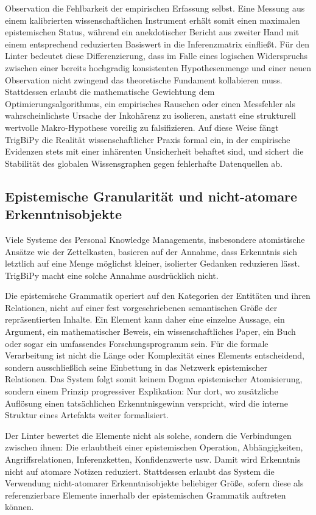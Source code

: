 \documentclass[11pt, a4paper]{article}
\begin{document}
Observation die Fehlbarkeit der empirischen Erfassung selbst. Eine Messung aus einem kalibrierten wissenschaftlichen Instrument erhält somit einen maximalen epistemischen Status, während ein anekdotischer Bericht aus zweiter Hand mit einem entsprechend reduzierten Basiswert in die Inferenzmatrix einfließt. Für den Linter bedeutet diese Differenzierung, dass im Falle eines logischen Widerspruchs zwischen einer bereits hochgradig konsistenten Hypothesenmenge und einer neuen Observation nicht zwingend das theoretische Fundament kollabieren muss. Stattdessen erlaubt die mathematische Gewichtung dem Optimierungsalgorithmus, ein empirisches Rauschen oder einen Messfehler als wahrscheinlichste Ursache der Inkohärenz zu isolieren, anstatt eine strukturell wertvolle Makro-Hypothese voreilig zu falsifizieren. Auf diese Weise fängt TrigBiPy die Realität wissenschaftlicher Praxis formal ein, in der empirische Evidenzen stets mit einer inhärenten Unsicherheit behaftet sind, und sichert die Stabilität des globalen Wissensgraphen gegen fehlerhafte Datenquellen ab.
	
	
	\subsection{Epistemische Granularität und nicht-atomare Erkenntnisobjekte}
	
	Viele Systeme des Personal Knowledge Managements, insbesondere atomistische Ansätze wie der Zettelkasten, basieren auf der Annahme, dass Erkenntnis sich letztlich auf eine Menge möglichst kleiner, isolierter Gedanken reduzieren lässt. TrigBiPy macht eine solche Annahme ausdrücklich nicht. 
	
	Die epistemische Grammatik operiert auf den Kategorien der Entitäten und ihren Relationen, nicht auf einer fest vorgeschriebenen semantischen Größe der repräsentierten Inhalte. Ein Element kann daher eine einzelne Aussage, ein Argument, ein mathematischer Beweis, ein wissenschaftliches Paper, ein Buch oder sogar ein umfassendes Forschungsprogramm sein. Für die formale Verarbeitung ist nicht die Länge oder Komplexität eines Elements entscheidend, sondern ausschließlich seine Einbettung in das Netzwerk epistemischer Relationen. Das System folgt somit keinem Dogma epistemischer Atomisierung, sondern einem Prinzip progressiver Explikation: Nur dort, wo zusätzliche Auflösung einen tatsächlichen Erkenntnisgewinn verspricht, wird die interne Struktur eines Artefakts weiter formalisiert.
	
	Der Linter bewertet die Elemente nicht als solche, sondern die Verbindungen zwischen ihnen: Die erlaubtheit einer epistemischen Operation, Abhängigkeiten, Angriffsrelationen, Inferenzketten, Konfidenzwerte usw. Damit wird Erkenntnis nicht auf atomare Notizen reduziert. Stattdessen erlaubt das System die Verwendung nicht-atomarer Erkenntnisobjekte beliebiger Größe, sofern diese als referenzierbare Elemente innerhalb der epistemischen Grammatik auftreten können.
	
\end{document}
